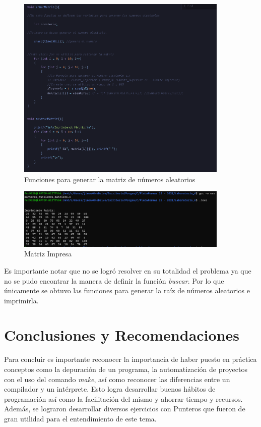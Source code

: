 \documentclass[12pt,a4paper]{article}
\begin{document}
\begin{figure}[H]
    \centering
    \center
    \includegraphics[width=0.9\textwidth]{Fotos_Lab6/Figura15.png}
    \caption{Funciones para generar la matriz de números aleatorios}
    \label{1}
\end{figure}

\begin{figure}[H]
    \centering
    \center
    \includegraphics[width=0.9\textwidth]{Fotos_Lab6/Figura16.png}
    \caption{Matriz Impresa}
    \label{1}
\end{figure}

Es importante notar que no se logró resolver en su totalidad el problema ya que no se pudo encontrar la manera de definir la función \textit{buscar}. Por lo que únicamente se obtuvo las funciones para generar la raíz de números aleatorios e imprimirla.

\section{Conclusiones y Recomendaciones}

Para concluir es importante reconocer la importancia de haber puesto en práctica conceptos como la depuración de un programa, la automatización de proyectos con el uso del comando \textit{make}, así como reconocer las diferencias entre un compilador y un intérprete. Esto logra desarrollar buenos hábitos de programación así como la facilitación del mismo y ahorrar tiempo y recursos. Además, se lograron desarrollar diversos ejercicios con Punteros que fueron de gran utilidad para el entendimiento de este tema. 
\end{document}
